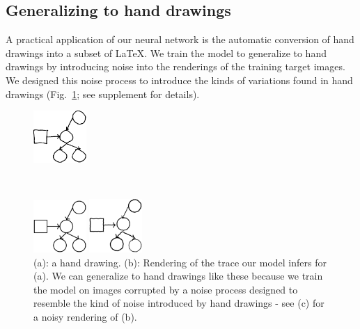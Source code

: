 \documentclass{article}
\begin{document}
\subsection{Generalizing to hand drawings}
A practical application of our neural network is the automatic conversion of hand drawings into a subset of \LaTeX.
 We train the model
to generalize to hand drawings by introducing noise into the
renderings of the training target images.
We designed this noise process to introduce the kinds of variations found in hand drawings (Fig.~\ref{handDrawingExamples}; see supplement for details).

\begin{figure}
\centering  \begin{minipage}[t]{2.5cm}\centering\includegraphics[width = 2cm]{figures/expert-60-reduced.png}
    \subcaption{}
  \end{minipage}\\
   \begin{minipage}[t]{2.5cm}\includegraphics[width = 2cm]{figures/60-groundTruth-reduced.png}
    \subcaption{}
  \end{minipage}%
  \begin{minipage}[t]{2.5cm}\includegraphics[width = 2cm]{figures/60-1-reduced.png}
    \subcaption{}
  \end{minipage}%
    \caption{(a): a hand drawing. (b): Rendering of the trace our model infers for (a). We can generalize to hand drawings like these because we train the model on images corrupted by a noise process designed to resemble the kind of noise introduced by hand drawings - see (c) for a noisy rendering of (b).}\label{handDrawingExamples}
\end{figure}
\end{document}
